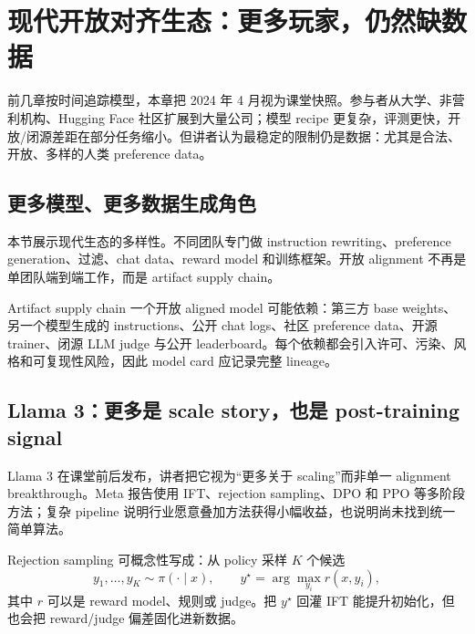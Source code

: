 \section{现代开放对齐生态：更多玩家，仍然缺数据}

前几章按时间追踪模型，本章把 2024 年 4 月视为课堂快照。参与者从大学、非营利机构、Hugging Face 社区扩展到大量公司；模型 recipe 更复杂，评测更快，开放/闭源差距在部分任务缩小。但讲者认为最稳定的限制仍是数据：尤其是合法、开放、多样的人类 preference data。

\subsection{更多模型、更多数据生成角色}

本节展示现代生态的多样性。不同团队专门做 instruction rewriting、preference generation、过滤、chat data、reward model 和训练框架。开放 alignment 不再是单团队端到端工作，而是 artifact supply chain。


\begin{knowledgebox}{Artifact supply chain}
一个开放 aligned model 可能依赖：第三方 base weights、另一个模型生成的 instructions、公开 chat logs、社区 preference data、开源 trainer、闭源 LLM judge 与公开 leaderboard。每个依赖都会引入许可、污染、风格和可复现性风险，因此 model card 应记录完整 lineage。
\end{knowledgebox}

\subsection{Llama 3：更多是 scale story，也是 post-training signal}

Llama 3 在课堂前后发布，讲者把它视为“更多关于 scaling”而非单一 alignment breakthrough。Meta 报告使用 IFT、rejection sampling、DPO 和 PPO 等多阶段方法；复杂 pipeline 说明行业愿意叠加方法获得小幅收益，也说明尚未找到统一简单算法。


Rejection sampling 可概念性写成：从 policy 采样 $K$ 个候选
\[
y_1,\ldots,y_K\sim\pi(\cdot\mid x),
\qquad y^{\star}=\arg\max_{y_i} r(x,y_i),
\]
其中 $r$ 可以是 reward model、规则或 judge。把 $y^{\star}$ 回灌 IFT 能提升初始化，但也会把 reward/judge 偏差固化进新数据。


